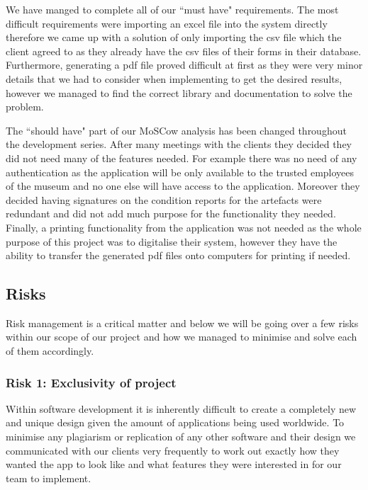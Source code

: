 \documentclass[12pt]{article}
\begin{document}
\par
We have manged to complete all of our ``must have" requirements. The most difficult requirements were importing an excel file into the system directly therefore we came up with a solution of only importing the csv file which the client agreed to as they already have the csv files of their forms in their database. Furthermore, generating a pdf file proved difficult at first as they were very minor details that we had to consider when implementing to get the desired results, however we managed to find the correct library and documentation to solve the problem.

\par
The ``should have" part of our MoSCow analysis has been changed throughout the development series. After many meetings with the clients they decided they did not need many of the features needed. For example there was no need of any authentication as the application will be only available to the trusted employees of the museum and no one else will have access to the application. Moreover they decided having signatures on the condition reports for the artefacts were redundant and did not add much purpose for the functionality they needed. Finally, a printing functionality from the application was not needed as the whole purpose of this project was to digitalise their system, however they have the ability to transfer the generated pdf files onto computers for printing if needed.

\subsection{Risks}
Risk management is a critical matter and below we will be going over a few risks within our scope of our project and how we managed to minimise and solve each of them accordingly. 

\subsubsection{Risk 1: Exclusivity of project}
Within software development it is inherently difficult to create a completely new and unique design given the amount of applications being used worldwide. To minimise any plagiarism or replication of any other software and their design we communicated with our clients very frequently to work out exactly how they wanted the app to look like and what features they were interested in for our team to implement. 
\end{document}
